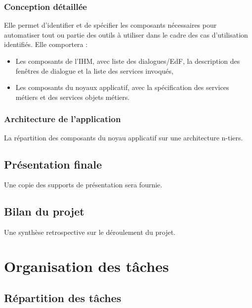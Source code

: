\subsubsection{Conception détaillée} Elle permet d'identifier et de spécifier les composants nécessaires pour automatiser tout ou partie des outils à utiliser dans le cadre des cas d'utilisation identifiés. Elle comportera :

\begin{itemize}
\item Les composants de l'IHM, avec liste des dialogues/EdF, la description des fenêtres de dialogue et la liste des services invoqués,
\item Les composants du noyaux applicatif, avec la spécification des services métiers et des services objets métiers.
\end{itemize}

\subsubsection{Architecture de l'application} La répartition des composants du noyau applicatif sur une architecture n-tiers.

\subsection{Présentation finale}

Une copie des supports de présentation sera fournie.

\subsection{Bilan du projet}

Une synthèse retrospective sur le déroulement du projet.

\section{Organisation des tâches}

\subsection{Répartition des tâches}

